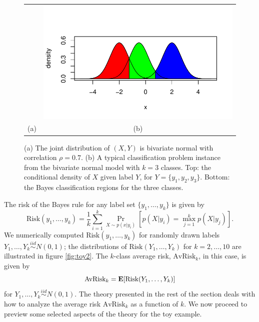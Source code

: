 \documentclass[12pt]{article}
\begin{document}
\begin{figure}[h]
\begin{tabular}{cc}
 &  \includegraphics[scale = 0.5, clip = true, trim = 0 0 0 0.5in]{extrapolation_figures/illus_example1b.pdf}\\
(a) & (b)
\end{tabular}

\caption{
(a) The joint distribution of $(X, Y)$ is bivariate normal with correlation $\rho = 0.7$.
(b) A typical classification problem instance from the bivariate normal model with $k = 3$ classes.
Top: the conditional density of $X$ given label $Y$, for $Y = \{y_1, y_2, y_3\}$.
Bottom: the Bayes classification regions for the three classes.}\label{fig:toy1}
\end{figure}

The risk of the Bayes rule for any label set $\{y_1,\hdots, y_k\}$ is given by
\[
\text{Risk}(y_1,\hdots, y_k) = \frac{1}{k}\sum_{i=1}^k \Pr_{X \sim p(x|y_i)}[p(X|y_i) = \max_{j=1}^k p(X|y_j)].
\]
We numerically computed $\text{Risk}(y_1,\hdots, y_k)$ for randomly
drawn labels $Y_1,\hdots, Y_k \stackrel{iid}{\sim} N(0, 1)$; the
distributions of $\text{Risk}(Y_1,\hdots, Y_k)$ for $k = 2,\hdots, 10$
are illustrated in figure \ref{fig:toy2}.  The $k$-class average risk,
$\text{AvRisk}_k$, in this case, is given by
\[
\text{AvRisk}_k = \textbf{E}[\text{Risk}(Y_1,\hdots, Y_k)]
\]
for $Y_1,\hdots, Y_k \stackrel{iid}{\sim} N(0, 1)$. The theory
presented in the rest of the section deals with how to analyze the
average risk $\text{AvRisk}_k$ as a function of $k$.  We now proceed
to preview some selected aspects of the theory for the toy example.
\end{document}
